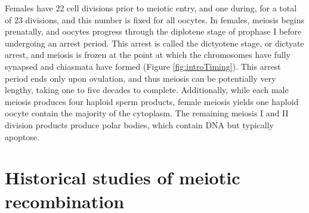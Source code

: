 Females have 22 cell divisions prior to meiotic entry, and one during, for a total of 23 divisions\cite{Crow2000a}, and this number is fixed for all oocytes.
In females, meiosis begins prenatally, and oocytes progress through the diplotene stage of prophase I before undergoing an arrest period\cite{Hassold2001,Crow2000a}.
This arrest is called the dictyotene stage, or dictyate arrest, and meiosis is frozen at the point at which the chromosomes have fully synapsed and chiasmata have formed (Figure \ref{fig:introTiming}).
This arrest period ends only upon ovulation, and thus meiosis can be potentially very lengthy, taking one to five decades to complete.
Additionally, while each male meiosis produces four haploid sperm products, female meiosis yields one haploid oocyte contain the majority of the cytoplasm.
The remaining meiosis I and II division products produce polar bodies, which contain DNA but typically apoptose\cite{Schmerler2011}.




\section{Historical studies of meiotic recombination}

